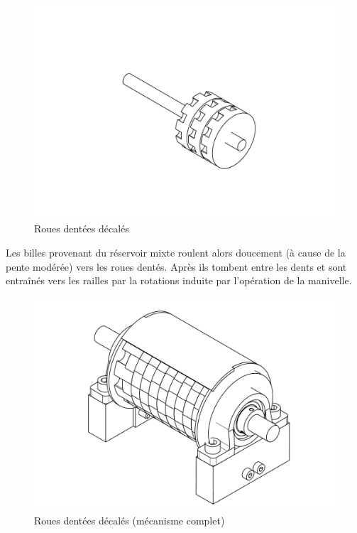 \begin{figure}
    \centering
    \includegraphics[width=\textwidth]{Graphics/Roue/DRAWING_ROUES_DENTEES_DECALES.pdf}
    \caption{Roues dentées décalés}
\end{figure}

Les billes provenant du réservoir mixte roulent alors doucement (à cause de la pente modérée)  vers les roues dentés. Après ils tombent entre les dents et sont entraînés vers les railles par la rotations induite par l'opération de la manivelle.

\begin{figure}
    \centering
    \includegraphics[width=\textwidth]{Graphics/Roue/DRAWING_COUVERCLE_COMPLET.pdf}
    \caption{Roues dentées décalés (mécanisme complet)}
\end{figure}

